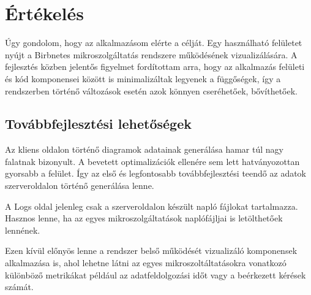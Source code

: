 \chapter{Értékelés}
\label{chapt:summary}
Úgy gondolom, hogy az alkalmazásom elérte a célját.
Egy használható felületet nyújt a Birbnetes mikroszolgáltatás rendszere működésének vizualizálására.
A fejlesztés közben jelentős figyelmet fordítottam arra, hogy az alkalmazás felületi és kód komponensei között is
minimalizáltak legyenek a függőségek, így a rendszerben történő változások esetén azok könnyen cseréhetőek, bővíthetőek.
\section{Továbbfejlesztési lehetőségek}
Az kliens oldalon történő diagramok adatainak generálása hamar túl nagy falatnak bizonyult.
A bevetett optimalizációk ellenére sem lett hatványozottan gyorsabb a felület.
Így az első és legfontosabb továbbfejlesztési teendő az adatok szerveroldalon történő generálása lenne.

A Logs oldal jelenleg csak a szerveroldalon készült napló fájlokat tartalmazza.
Hasznos lenne, ha az egyes mikroszolgáltatások naplófájljai is letölthetőek lennének.

Ezen kívül előnyös lenne a rendszer belső működését vizualizáló komponensek alkalmazása is, 
ahol lehetne látni az egyes mikroszoltáltatásokra vonatkozó különböző metrikákat például az adatfeldolgozási időt vagy a beérkezett kérések számát. 